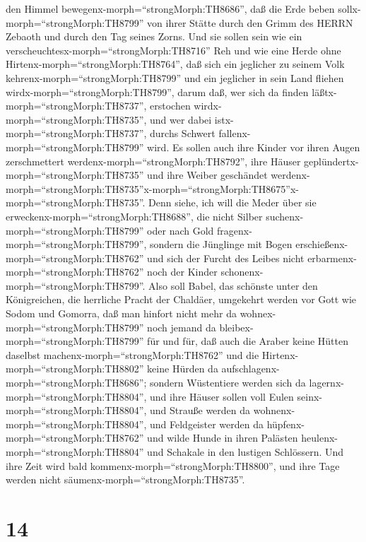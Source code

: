 den Himmel bewegenx-morph=``strongMorph:TH8686'', daß die Erde beben
sollx-morph=``strongMorph:TH8799'' von ihrer Stätte durch den Grimm des
HERRN Zebaoth und durch den Tag seines Zorns.  Und sie
sollen sein wie ein verscheuchtesx-morph=``strongMorph:TH8716'' Reh und
wie eine Herde ohne Hirtenx-morph=``strongMorph:TH8764'', daß sich ein
jeglicher zu seinem Volk kehrenx-morph=``strongMorph:TH8799'' und ein
jeglicher in sein Land fliehen wirdx-morph=``strongMorph:TH8799'',
 darum daß, wer sich da finden
läßtx-morph=``strongMorph:TH8737'', erstochen
wirdx-morph=``strongMorph:TH8735'', und wer dabei
istx-morph=``strongMorph:TH8737'', durchs Schwert
fallenx-morph=``strongMorph:TH8799'' wird.  Es sollen auch
ihre Kinder vor ihren Augen zerschmettert
werdenx-morph=``strongMorph:TH8792'', ihre Häuser
geplündertx-morph=``strongMorph:TH8735'' und ihre Weiber geschändet
werdenx-morph=``strongMorph:TH8735''\textbar x-morph=``strongMorph:TH8675''x-morph=``strongMorph:TH8735''.
 Denn siehe, ich will die Meder über sie
erweckenx-morph=``strongMorph:TH8688'', die nicht Silber
suchenx-morph=``strongMorph:TH8799'' oder nach Gold
fragenx-morph=``strongMorph:TH8799'',  sondern die
Jünglinge mit Bogen erschießenx-morph=``strongMorph:TH8762'' und sich
der Furcht des Leibes nicht erbarmenx-morph=``strongMorph:TH8762'' noch
der Kinder schonenx-morph=``strongMorph:TH8799''.  Also
soll Babel, das schönste unter den Königreichen, die herrliche Pracht
der Chaldäer, umgekehrt werden vor Gott wie Sodom und Gomorra,
 daß man hinfort nicht mehr da
wohnex-morph=``strongMorph:TH8799'' noch jemand da
bleibex-morph=``strongMorph:TH8799'' für und für, daß auch die Araber
keine Hütten daselbst machenx-morph=``strongMorph:TH8762'' und die
Hirtenx-morph=``strongMorph:TH8802'' keine Hürden da
aufschlagenx-morph=``strongMorph:TH8686'';  sondern
Wüstentiere werden sich da lagernx-morph=``strongMorph:TH8804'', und
ihre Häuser sollen voll Eulen seinx-morph=``strongMorph:TH8804'', und
Strauße werden da wohnenx-morph=``strongMorph:TH8804'', und Feldgeister
werden da hüpfenx-morph=``strongMorph:TH8762''  und wilde
Hunde in ihren Palästen heulenx-morph=``strongMorph:TH8804'' und
Schakale in den lustigen Schlössern. Und ihre Zeit wird bald
kommenx-morph=``strongMorph:TH8800'', und ihre Tage werden nicht
säumenx-morph=``strongMorph:TH8735''.

\hypertarget{section-13}{%
\section{14}\label{section-13}}

